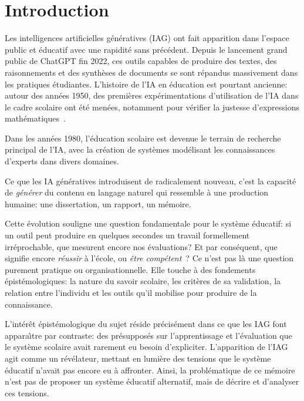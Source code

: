 \section{Introduction}


Les intelligences artificielles g\'en\'eratives (IAG) ont fait apparition dans l'espace public et \'educatif avec une rapidit\'e sans pr\'ec\'edent. 
Depuis le lancement grand public de ChatGPT fin 2022, ces outils capables de produire des textes, des raisonnements et des synth\`eses de documents se sont r\'epandus massivement dans les pratiques \'etudiantes. 
L'histoire de l'IA en \'education est pourtant ancienne: autour des années 1950, des premières expérimentations d'utilisation de l'IA dans le cadre scolaire ont \'et\'e men\'ees, notamment pour vérifier la justesse d'expressions math\'ematiques~\citep{siham2024intelligence}.

Dans les années 1980, l'éducation scolaire est devenue le terrain de recherche principal de l'IA, avec la création de systèmes modélisant les connaissances d'experts dans divers domaines.

Ce que les IA g\'en\'eratives introduisent de radicalement nouveau, c'est la capacit\'e de \emph{g\'en\'erer} du contenu en langage naturel qui ressemble \`a une production humaine: une dissertation, un rapport, un m\'emoire.

Cette \'evolution souligne une question fondamentale pour le syst\`eme \'educatif: si un outil peut produire en quelques secondes un travail formellement irr\'eprochable, que mesurent encore nos \'evaluations?
Et par cons\'equent, que signifie encore \emph{r\'eussir} \`a l'\'ecole, ou \emph{\^etre comp\'etent}~? Ce n'est pas l\`a une question purement pratique ou organisationnelle. 
Elle touche \`a des fondements \'epist\'emologiques: la nature du savoir scolaire, les crit\`eres de sa validation, la relation entre l'individu et les outils qu'il mobilise pour produire de la connaissance.

L'int\'er\^et \'epist\'emologique du sujet r\'eside pr\'ecis\'ement dans ce que les IAG font appara\^\i tre par contraste: des pr\'esuppos\'es sur l'apprentissage et l'\'evaluation que le syst\`eme scolaire avait rarement eu besoin d'expliciter.
L'apparition de l'IAG agit comme un r\'ev\'elateur, mettant en lumi\`ere des tensions que le syst\`eme \'educatif n'avait pas encore eu \`a affronter.
Ainsi, la probl\'ematique de ce m\'emoire n'est pas de proposer un syst\`eme \'educatif alternatif, mais de d\'ecrire et d'analyser ces tensions.

